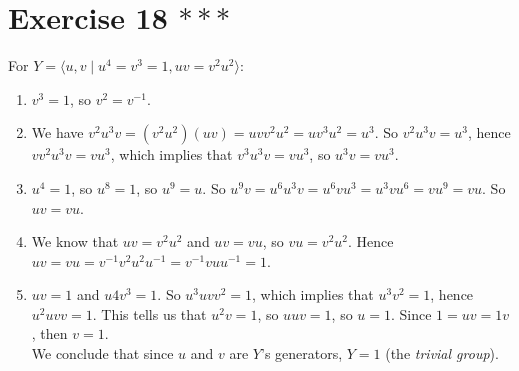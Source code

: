 \documentclass[12pt]{article}
\begin{document}
    \section*{Exercise 18 $***$}
    For $Y = \langle u, v \mid u^4 = v^3 = 1, uv = v^2u^2 \rangle$:
    \begin{enumerate}[label=\textbf{\alph*.}]
        \item 
            $v^3 = 1$, so $v^2 = v^{-1}$.
        \item 
            We have $v^2u^3v = (v^2u^2)(uv) = uvv^2u^2 = uv^3u^2 = u^3$.
            So $v^2u^3v = u^3$,
            hence $vv^2u^3v = vu^3$,
            which implies that $v^3u^3v = vu^3$,
            so $ u^3v = vu^3$.
        \item 
            $u^4 = 1$, so $u^8 = 1$, so $u^9 = u$.
            So $u^9v = u^6u^3v = u^6vu^3 = u^3vu^6 = vu^9 = vu$.
            So $uv = vu$.
        \item 
            We know that $uv = v^2u^2$ and $uv = vu$,
            so $vu = v^2u^2$.
            Hence $uv = vu = v^{-1}v^2u^2u^{-1} = v^{-1}vuu^{-1} = 1$.
        \item 
            $uv = 1$ and $u4v^3 = 1$.
            So $u^3uvv^2 = 1$,
            which implies that $u^3v^2 = 1$,
            hence $u^2uvv = 1$.
            This tells us that $u^2v = 1$,
            so $uuv = 1$,
            so $u = 1$.
            Since $1 = uv = 1v$, 
            then $v = 1$. \\
            We conclude that since $u$ and $v$ are $Y$'s generators,
            $Y = {1}$ (the \textit{trivial group}).

    \end{enumerate}   
\end{document}
